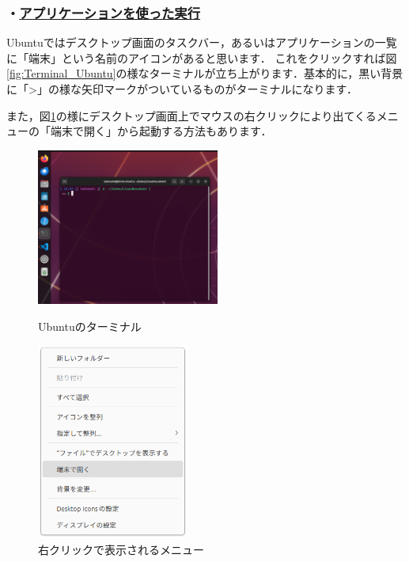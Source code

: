 \documentclass[autodetect-engine,dvi=dvipdfmx,ja=standard,a4j]{bxjsarticle}
\begin{document}
\subsubsection*{・\underline{アプリケーションを使った実行}}
Ubuntuではデスクトップ画面のタスクバー，あるいはアプリケーションの一覧に「端末」という名前のアイコンがあると思います．
これをクリックすれば図\ref{fig:Terminal_Ubuntu}の様なターミナルが立ち上がります．基本的に，黒い背景に「\textgreater」の様な矢印マークがついているものがターミナルになります．

また，図\ref{fig:Ubuntu_Menu}の様にデスクトップ画面上でマウスの右クリックにより出てくるメニューの「端末で開く」から起動する方法もあります．

\begin{figure}[H]
    \centering
\begin{minipage}[h]{0.45\linewidth}
    \centering
    \includegraphics[width=60mm]{image/Terminal_ubuntu.png}
    \caption{Ubuntuのターミナル}
    \label{fig:Terminal_Ubuntu}
\end{minipage}
\hspace{10mm}
\begin{minipage}[h]{0.45\linewidth}
    \centering
    \includegraphics[width=50mm]{image/Ubuntu_Menu.png}
    \caption{右クリックで表示されるメニュー}
    \label{fig:Ubuntu_Menu}
\end{minipage}
\end{figure}
\end{document}
